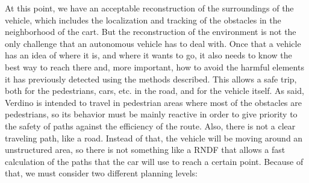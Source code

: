 At this point, we have an acceptable reconstruction of the surroundings of the vehicle, which includes the localization and tracking of the obstacles in the neighborhood of the cart. But the reconstruction of the environment is not the only challenge that an autonomous vehicle has to deal with. Once that a vehicle has an idea of where it is, and where it wants to go, it also needs to know the best way to reach there and, more important, how to avoid the harmful elements it has previously detected using the methods described. This allows a safe trip, both for the pedestrians, cars, etc. in the road, and for the vehicle itself.
As said, Verdino is intended to travel in pedestrian areas where most of the obstacles are pedestrians, so its behavior must be mainly reactive in order to give priority to the safety of paths against the efficiency of the route. Also, there is not a clear traveling path, like a road. Instead of that, the vehicle will be moving around an unstructured area, so there is not something like a \ac{RNDF} that allows a fast calculation of the paths that the car will use to reach a certain point. Because of that, we must consider two different planning levels:
